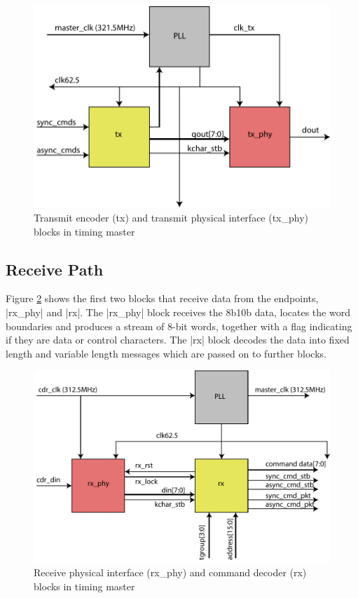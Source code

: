 \documentclass{dune}
\begin{document}
\begin{figure}[h!]
    \centering
    \includegraphics{timing_system_tx_02-crop.pdf}
    \caption{Transmit encoder (tx) and transmit physical interface (tx\_phy) blocks in timing master}
    \label{fig:tx_txPhy}
\end{figure}

\subsection{Receive Path}

Figure \ref{fig:rx_rxPhy} shows the first two blocks that receive data from the endpoints, |rx_phy| and |rx|. The |rx_phy| block receives the 8b10b data, locates the word boundaries and produces a stream of 8-bit words, together with a flag indicating if they are data or control characters. The |rx| block decodes the data into fixed length and variable length messages which are passed on to further blocks.

\begin{figure}[h!]
    \centering
    \includegraphics{timing_system_rx_02-crop.pdf}
    \caption{Receive physical interface (rx\_phy) and command decoder (rx) blocks in timing master}
    \label{fig:rx_rxPhy}
\end{figure}
\end{document}
